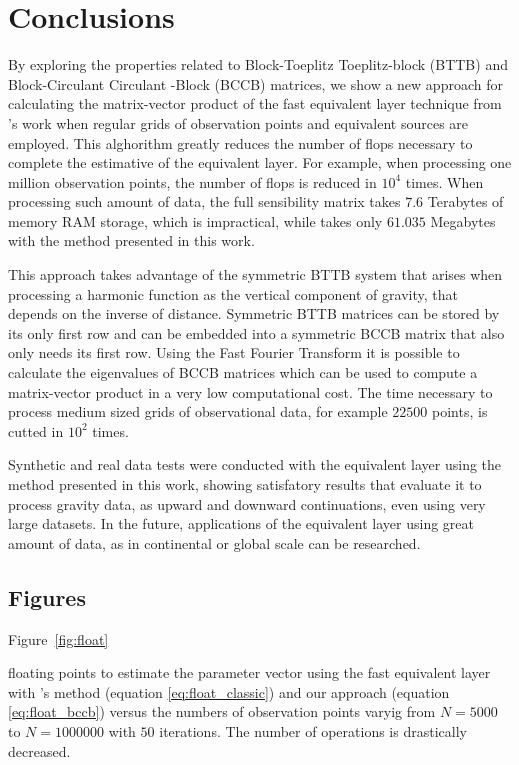 \documentclass[paper]{geophysics}
\begin{document}
\section{Conclusions}
By exploring the properties related to Block-Toeplitz Toeplitz-block (BTTB) and Block-Circulant Circulant -Block (BCCB) matrices, we show a new approach for calculating the matrix-vector product of the fast equivalent layer technique from \cite{siqueira2017fast}'s work when regular grids of observation points and equivalent sources are employed. This alghorithm greatly reduces the number of flops necessary to complete the estimative of the equivalent layer. For example, when processing one million observation points, the number of flops is reduced in $10^4$ times. When processing such amount of data, the full sensibility matrix takes $7.6$ Terabytes of memory RAM storage, which is impractical, while takes only $61.035$ Megabytes with the method presented in this work.

This approach takes advantage of the symmetric BTTB system that arises when processing a harmonic function as the vertical component of gravity, that depends on the inverse of distance. Symmetric BTTB matrices can be stored by its only first row and can be embedded into a symmetric BCCB matrix that also only needs its first row. Using the Fast Fourier Transform it is possible to calculate the eigenvalues of BCCB matrices which can be used to compute a matrix-vector product in a very low computational cost. The time necessary to process medium sized grids of observational data, for example $22500$ points, is cutted in $10^2$ times.

Synthetic and real data tests were conducted with the equivalent layer using the method presented in this work, showing satisfatory results that evaluate it to process gravity data, as upward and downward continuations, even using very large datasets. In the future, applications of the equivalent layer using great amount of data, as in continental or global scale can be researched.
\newpage



\subsection*{Figures}
\renewcommand{\figdir}{Fig} %

Figure~\ref{fig:float}

{floating points to estimate the parameter vector using the fast equivalent layer with \cite{siqueira2017fast}'s method (equation \ref{eq:float_classic}) and our approach (equation \ref{eq:float_bccb}) versus the numbers of observation points varyig from $N = 5000$ to $N = 1000000$ with $50$ iterations. The number of operations is drastically decreased.}
\newpage
\end{document}
